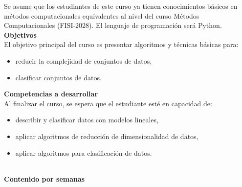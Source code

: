 \documentclass[letterpaper,10pt,onecolumn]{article}
\begin{document}
Se asume que los estudiantes de este curso ya tienen conocimientos
b\'asicos en m\'etodos computacionales equivalentes al nivel del curso
M\'etodos Computacionales (FISI-2028).
El lenguaje de programaci\'on ser\'a Python.
\\[0.1cm] 

\noindent\textbf{\large {} \quad Objetivos}\\[-0.2cm]

\noindent\normalsize El objetivo principal del curso es presentar
algoritmos y t\'ecnicas b\'asicas para:

\begin{itemize}
\item reducir la complejidad de conjuntos de datos,
\\[-0.6cm]
\item clasificar conjuntos de datos.
\\[-0.6cm]
\end{itemize} 
\vspace*{0.5cm} 

\noindent\textbf{\large {} \quad Competencias a
  desarrollar}\\[-0.2cm] 


\noindent\normalsize Al finalizar el curso, se espera que el
estudiante est\'e en capacidad de: 

\begin{itemize}
\item describir y clasificar datos con modelos lineales, \\[-0.6cm]   
\item aplicar algoritmos de reducci\'on de dimensionalidad de datos,\\[-0.6cm]  
\item aplicar algoritmos para clasificaci\'on de datos.\\[-0.6cm]
\\[-0.6cm]  
\end{itemize}

\vspace*{0.5cm} 

\noindent\textbf{\large {} \quad Contenido por
  semanas}\\[-0.2cm]  
\end{document}
